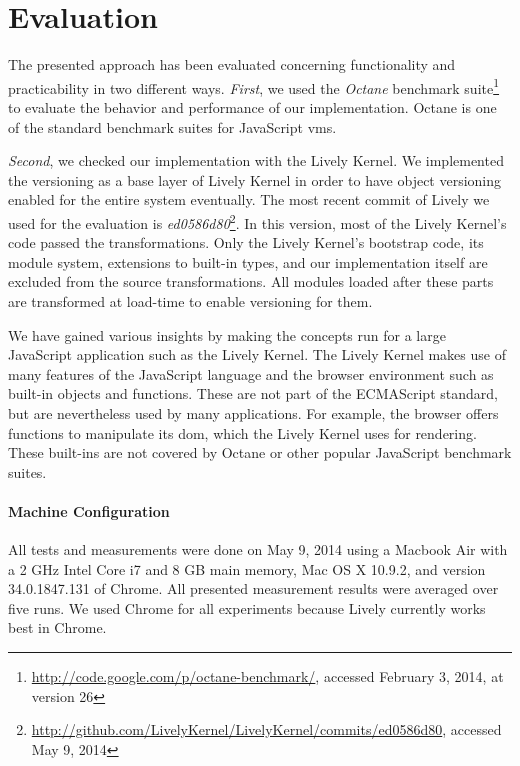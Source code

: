 \section{Evaluation} \label{chapter:EVALUATION}

The presented approach has been evaluated concerning functionality and
practicability in two different ways. \emph{First}, we used the
\emph{Octane} benchmark
suite\footnote{\url{http://code.google.com/p/octane-benchmark/},
  accessed February 3, 2014, at version 26} to evaluate the behavior
and performance of our implementation. Octane is one of the standard
benchmark suites for JavaScript \acp{vm}.

\emph{Second}, we checked our implementation with the Lively Kernel. We
implemented the versioning as a base layer of Lively Kernel in order
to have object versioning enabled for the entire system
eventually. The most recent commit of Lively we used for the
evaluation is
\emph{ed0586d80}\footnote{\url{http://github.com/LivelyKernel/LivelyKernel/commits/ed0586d80},
  accessed May 9, 2014}. In this version, most of the Lively Kernel's
code passed the transformations.  Only the Lively Kernel's bootstrap
code, its module system, extensions to built-in types, and our
implementation itself are excluded from the source transformations.
All modules loaded after these parts are transformed at load-time to
enable versioning for them. 

We have gained various insights by making the concepts run for a large
JavaScript application such as the Lively Kernel. The Lively Kernel
makes use of many features of the JavaScript language and the browser
environment such as built-in objects and functions. These are not part
of the ECMAScript standard, but are nevertheless used by many
applications. For example, the browser offers functions to manipulate
its \ac{dom}, which the Lively Kernel uses for rendering. These
built-ins are not covered by Octane or other popular JavaScript
benchmark suites.

\paragraph{Machine Configuration}
All tests and measurements were done on May 9, 2014 using a Macbook
Air with a 2 GHz Intel Core i7 and 8 GB main memory, Mac OS X 10.9.2,
and version 34.0.1847.131 of Chrome.  All presented measurement
results were averaged over five runs. We used Chrome for all
experiments because Lively currently works best in Chrome.


